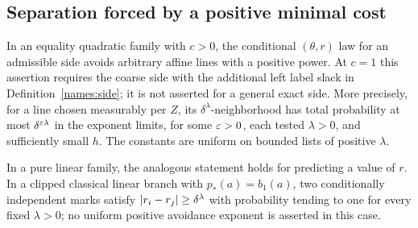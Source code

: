 \subsection{Separation forced by a positive minimal cost}

\begin{proposition}\label{names:separation}
In an equality quadratic family with \(c>0\), the conditional
\((\theta,r)\) law for an admissible side avoids arbitrary
affine lines with a positive power. At \(c=1\) this assertion
requires the coarse side with the additional left label slack
in Definition~\ref{names:side}; it is not asserted for a general
exact side. More precisely, for a line chosen measurably per
\(Z\), its \(\delta^\lambda\)-neighborhood has total
probability at most \(\delta^{\varepsilon\lambda}\) in the exponent
limits, for some \(\varepsilon>0\), each tested \(\lambda>0\), and
sufficiently small \(h\). The constants are uniform on bounded
lists of positive \(\lambda\).

In a pure linear family, the analogous statement holds for
predicting a value of \(r\). In a clipped classical linear
branch with \(p_*(a)=b_1(a)\), two conditionally independent
marks satisfy
\(\lvert r_i-r_j\rvert\geq\delta^\lambda\) with probability tending
to one for every fixed \(\lambda>0\); no uniform positive
avoidance exponent is asserted in this case.
\end{proposition}

